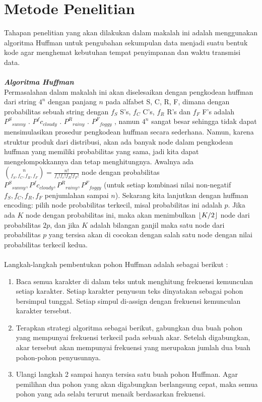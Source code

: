 \documentclass[journal]{IEEEtran}
\DeclarePairedDelimiter\floor{\lfloor}{\rfloor}
\begin{document}
\section{Metode Penelitian}
\hspace*{0.7cm}Tahapan penelitian yang akan dilakukan dalam makalah ini adalah menggunakan algoritma Huffman untuk pengubahan sekumpulan data menjadi suatu bentuk kode agar menghemat kebutuhan tempat penyimpanan dan waktu transmisi data.\\
\\
\textbf{\textit{Algoritma Huffman}}\\
\hspace*{0.7cm}Permasalahan dalam makalah ini akan diselesaikan dengan pengkodean huffman dari string $4^n$ dengan panjang $n$ pada alfabet {S, C, R, F}, dimana dengan probabilitas sebuah string dengan $f_S$ S's, $f_C$ C's, $f_R$ R's dan $f_F$ F's adalah ${P^S}_{sunny}$ . ${P^fc}_{cloudy}$ . ${P^R}_{rainy}$ . ${P^F}_{foggy}$ , namun $4^n$ sangat besar sehingga tidak dapat mensimulasikan prosedur pengkodean huffman secara sederhana. Namun, karena struktur produk dari distribusi, akan ada banyak node dalam pengkodean huffman yang memiliki probabilitas yang sama, jadi kita dapat mengelompokkannya dan tetap menghitungnya.\vspace*{1mm}
\hspace*{1cm}Awalnya ada $\binom{n}{f_S,f_C,f_R,f_F} = \frac{n!}{f_s! f_c! f_R! f_F!}$ node\vspace*{1mm} dengan probabilitas ${P^S}_{sunny} , {P^fc}_{cloudy} , {P^R}_{rainy} , {P^F}_{foggy}$ (untuk setiap kombinasi nilai non-negatif $f_S, f_C, f_R, f_F$ penjumlahan sampai $n$). Sekarang kita lanjutkan dengan huffman encoding: pilih node probabilitas terkecil, misal probabilitas ini adalah $p$. Jika ada $K$ node dengan probabilitas ini, maka akan menimbulkan $\floor*{K / 2}$ node dari probabilitas $2p$, dan jika $K$ adalah bilangan ganjil maka satu node dari probabilitas $p$ yang tersisa akan di cocokan dengan salah satu node dengan nilai probabilitas terkecil kedua.\\
\\
Langkah-langkah pembentukan pohon Huffman adalah sebagai berikut :
\begin{enumerate}
	\item Baca semua karakter di dalam teks untuk menghitung frekuensi kemunculan setiap karakter. Setiap karakter penyusun teks dinyatakan sebagai pohon bersimpul tunggal. Setiap simpul di-assign dengan frekuensi kemunculan karakter tersebut.
	\item Terapkan strategi algoritma sebagai berikut, gabungkan dua buah pohon yang mempunyai frekuensi terkecil pada sebuah akar. Setelah digabungkan, akar tersebut akan mempunyai frekuensi yang merupakan jumlah dua buah pohon-pohon penyusunnya.
	\item Ulangi langkah 2 sampai hanya tersisa satu buah pohon Huffman. Agar pemilihan dua pohon yang akan digabungkan berlangsung cepat, maka semua pohon yang ada selalu terurut menaik berdasarkan frekuensi.
\end{enumerate}
\end{document}
